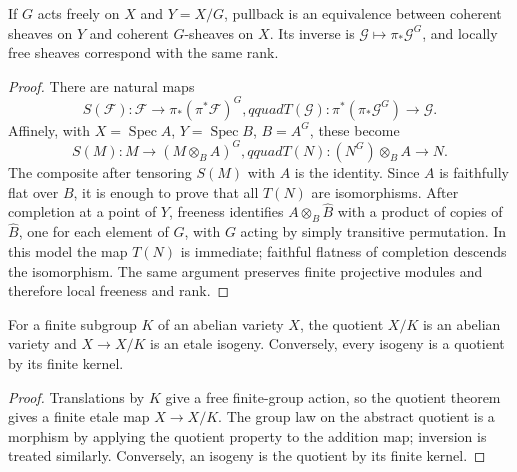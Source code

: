 \begin{proposition}
\label{mumford-prop-coherent-descent-finite-quotient}
If $G$ acts freely on $X$ and $Y=X/G$, pullback is an equivalence between
coherent sheaves on $Y$ and coherent $G$-sheaves on $X$.  Its inverse is
$\mathcal G\mapsto\pi_*\mathcal G^G$, and locally free sheaves correspond with
the same rank.
\end{proposition}
\begin{proof}
There are natural maps
\[
 S(\mathcal F):\mathcal F\to\pi_*(\pi^*\mathcal F)^G,qquad
 T(\mathcal G):\pi^*(\pi_*\mathcal G^G)\to\mathcal G.
\]
Affinely, with $X=\operatorname{Spec}A$, $Y=\operatorname{Spec}B$,
$B=A^G$, these become
\[
 S(M):M\to(M\otimes_BA)^G,qquad
 T(N):(N^G)\otimes_BA\to N.
\]
The composite after tensoring $S(M)$ with $A$ is the identity.  Since $A$ is
faithfully flat over $B$, it is enough to prove that all $T(N)$ are isomorphisms.
After completion at a point of $Y$, freeness identifies
$A\otimes_B\widehat B$ with a product of copies of $\widehat B$, one for each
element of $G$, with $G$ acting by simply transitive permutation.  In this
model the map $T(N)$ is immediate; faithful flatness of completion descends
the isomorphism.  The same argument preserves finite projective modules and
therefore local freeness and rank.
\end{proof}

\begin{proposition}
\label{mumford-prop-translation-quotient-isogeny}
For a finite subgroup $K$ of an abelian variety $X$, the quotient $X/K$ is an
abelian variety and $X\to X/K$ is an etale isogeny. Conversely, every isogeny
is a quotient by its finite kernel.
\end{proposition}
\begin{proof}
Translations by $K$ give a free finite-group action, so the quotient theorem
gives a finite etale map $X\to X/K$. The group law on the abstract quotient
is a morphism by applying the quotient property to the addition map; inversion
is treated similarly. Conversely, an isogeny is the quotient by its finite
kernel.
\end{proof}

